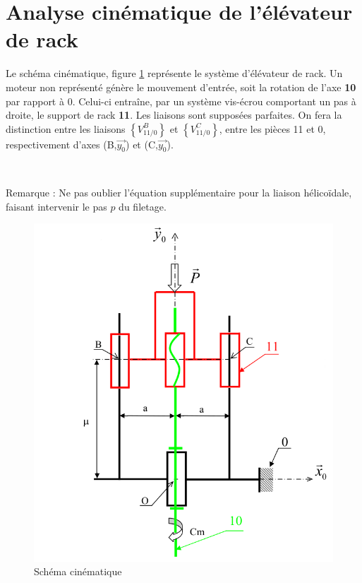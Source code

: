 \section{Analyse cinématique de l'élévateur de rack}

Le schéma cinématique, figure \ref{img2} représente le système d'élévateur de rack. Un moteur non représenté génère le mouvement d'entrée, soit la rotation de l'axe \textbf{10} par rapport à 0. Celui-ci entraîne, par un système vis-écrou comportant un pas à droite, le support de rack \textbf{11}. Les liaisons sont supposées parfaites. On fera la distinction entre les liaisons $\left\{V^B_{11/0}\right\}$ et $\left\{V^C_{11/0}\right\}$, entre les pièces 11 et 0, respectivement d'axes (B,$\vec{y_0}$) et (C,$\vec{y_0}$).



~\

Remarque : Ne pas oublier l'équation supplémentaire pour la liaison hélicoïdale, faisant intervenir le pas $p$ du filetage.



\newpage

\begin{figure}[!h]
  \centering\includegraphics[width=0.6\linewidth]{img/colleuse_cin.png}
  \caption{Schéma cinématique}
  \label{img2}
\end{figure}


